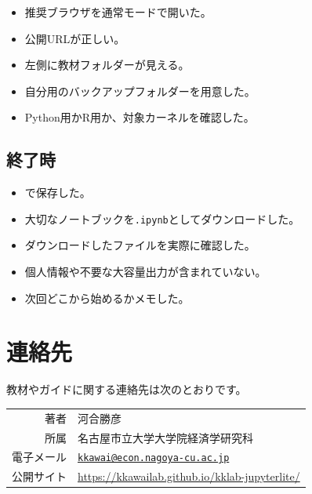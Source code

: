 \documentclass[a4paper,11pt]{ltjsarticle}
\newcommand{\keycap}[1]{%
  \tcbox[
    on line,
    colback=GuideLightGray,
    colframe=GuideGray!50,
    boxrule=0.4pt,
    arc=1.5pt,
    left=3pt,right=3pt,top=1pt,bottom=1pt
  ]{\sffamily\small #1}%
}
\newcommand{\siteurl}{\url{https://kkawailab.github.io/kklab-jupyterlite/}}
\begin{document}
\begin{itemize}
  \item[$\square$] 推奨ブラウザを通常モードで開いた。
  \item[$\square$] 公開URLが正しい。
  \item[$\square$] 左側に教材フォルダーが見える。
  \item[$\square$] 自分用のバックアップフォルダーを用意した。
  \item[$\square$] Python用かR用か、対象カーネルを確認した。
\end{itemize}

\subsection{終了時}

\begin{itemize}
  \item[$\square$] \keycap{Ctrl + S}で保存した。
  \item[$\square$] 大切なノートブックを\texttt{.ipynb}としてダウンロードした。
  \item[$\square$] ダウンロードしたファイルを実際に確認した。
  \item[$\square$] 個人情報や不要な大容量出力が含まれていない。
  \item[$\square$] 次回どこから始めるかメモした。
\end{itemize}

\section*{連絡先}

教材やガイドに関する連絡先は次のとおりです。

\begin{center}
\begin{tabular}{rl}
  著者 & 河合勝彦\\
  所属 & 名古屋市立大学大学院経済学研究科\\
  電子メール &
    \href{mailto:kkawai@econ.nagoya-cu.ac.jp}
    {\nolinkurl{kkawai@econ.nagoya-cu.ac.jp}}\\
  公開サイト & \siteurl
\end{tabular}
\end{center}
\end{document}
